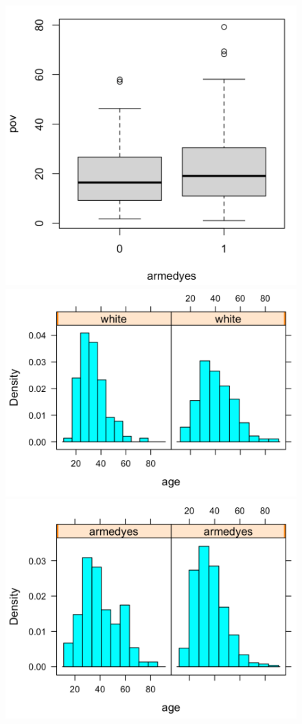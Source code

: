 \begin{figure}[h]
    \includegraphics[scale=.3]{boxplot_pov_armedyes.png}
    \includegraphics[scale=.3]{histplot_age_white.png}
    \includegraphics[scale=.3]{histplot_age_armedyes.png}

\end{figure}
